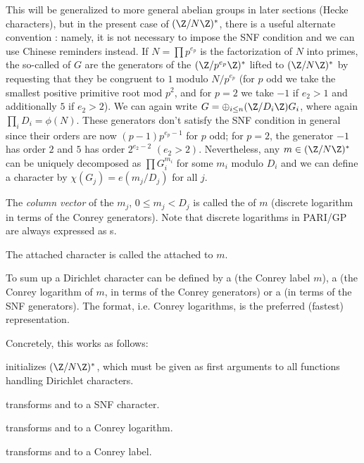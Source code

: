This will be generalized to more general abelian groups in later sections
(Hecke characters), but in the present case of $(\Z/N\Z)^*$, there is a useful
alternate convention : namely, it is not necessary to impose the SNF
condition and we can use Chinese reminders instead. If $N = \prod p^{e_p}$ is
the factorization of $N$ into primes, the so-called 
of $G$ are the generators of the $(\Z/p^{e_p}\Z)^*$ lifted to $(\Z/N\Z)^*$ by
requesting that they be congruent to $1$ modulo $N/p^{e_p}$ (for $p$ odd we
take the smallest positive primitive root mod $p^2$, and for $p = 2$
we take $-1$ if
$e_2 > 1$ and additionally $5$ if $e_2 > 2$). We can again write $G =
\oplus_{i\leq n} (\Z/D_i\Z) G_i$, where again $\prod_i D_i = \phi(N)$. These
generators don't satisfy the SNF condition in general since their orders are
now $(p-1)p^{e_p-1}$ for $p$ odd; for $p = 2$, the generator $-1$ has order
$2$ and $5$ has order $2^{e_2-2}$ $(e_2 > 2)$. Nevertheless, any $m\in
(\Z/N\Z)^*$ can be uniquely decomposed as $\prod G_i^{m_i}$ for some $m_i$
modulo $D_i$ and we can define a character by $\chi(G_j) = e(m_j / D_j)$ for
all $j$.

\item The \emph{column vector} of the $m_j$, $0 \leq m_j < D_j$ is called the
 of $m$ (discrete logarithm in terms of the Conrey
generators). Note that discrete logarithms in PARI/GP are always expressed as
s.

\item The attached character is called the 
attached to $m$.

To sum up a Dirichlet character can be defined by a  (the Conrey
label $m$), a  (the Conrey logarithm of $m$, in terms of the Conrey
generators) or a  (in  terms of the SNF generators). The 
format, i.e. Conrey logarithms, is the preferred (fastest) representation.

Concretely, this works as follows:

 initializes $(\Z/N\Z)^*$, which must be given as
first arguments to all functions handling Dirichlet characters.

 transforms  and  to a SNF character.

 transforms  and  to a Conrey logarithm.

 transforms  and  to a Conrey label.

